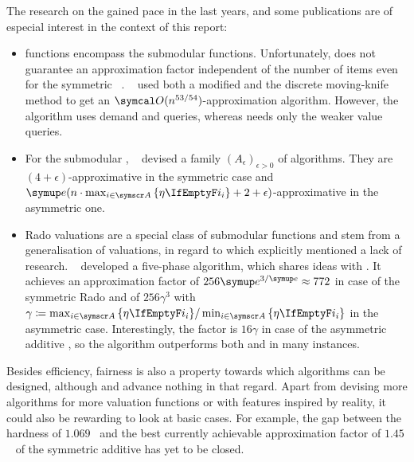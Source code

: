 The research on the \NSW{} gained pace in the last years, and some publications are of especial interest in the context of this report:
\begin{itemize}
	\item
	\XOS{} functions encompass the submodular functions.
	Unfortunately, \RepReMatch{} does not guarantee an approximation factor independent of the number of items even for the symmetric \XOS{} \NSW~\cite[Section 6.2]{APNSWuSVþUM}.
	~\cite{sublin_approx_algo_for_nsw_with_xos_valuations} used both a modified \RepReMatch{} and the discrete moving-knife method to get an \(\bigo(n^{53/54})\)-approximation algorithm.
	However, the algorithm uses demand and \XOS{} queries, whereas \RepReMatch{} needs only the weaker value queries.

	\item
	For the submodular \NSW, \citeauthor{approx_nsw_by_matching_and_local_search}~\cite{approx_nsw_by_matching_and_local_search} devised a family \((A_\epsilon)_{\epsilon > 0}\) of algorithms.
	They are \((4+\epsilon)\)-approximative in the symmetric case and \(\euler(n \cdot \max_{i \in \agents} \,\braces{\weight} + 2 + \epsilon)\)-approximative in the asymmetric one.

	\item
	Rado valuations are a special class of submodular functions and stem from a generalisation of \OXS{} valuations, in regard to which \citeauthor{APNSWuSVþUM} explicitly mentioned a lack of research.
	~\cite{approximating_nsw_under_rado_valuations} developed a five-phase algorithm, which shares ideas with \RepReMatch.
	It achieves an approximation factor of \(256 \euler^{3/\euler} \approx 772\) in case of the symmetric Rado \NSW{} and of \(256 \gamma^3\) with \(\gamma \coloneq \max_{i \in \agents} \,\braces{\weight} / \min_{i \in \agents} \,\braces{\weight}\) in the asymmetric case.
	Interestingly, the factor is \(16 \gamma\) in case of the asymmetric additive \NSW, so the algorithm outperforms both \SMatch{} and \RepReMatch{} in many instances.
\end{itemize}
Besides efficiency, fairness is also a property towards which algorithms can be designed, although \SMatch{} and \RepReMatch{} advance nothing in that regard.
Apart from devising more algorithms for more valuation functions or with features inspired by reality, it could also be rewarding to look at basic cases.
For example, the gap between the hardness of \(1.069\)~\cite{satiation_in_fisher_markets_and_approx_of_nsw} and the best currently achievable approximation factor of \(1.45\)~\cite{finding_fair_and_efficient_allocs} of the symmetric additive \NSW{} has yet to be closed.